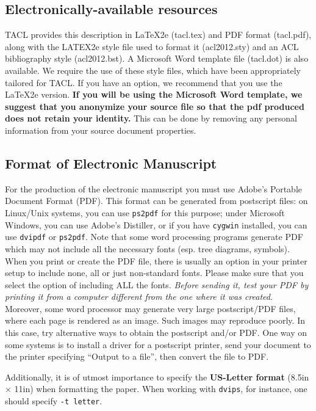 \documentclass[11pt,letterpaper]{article}
\begin{document}
\subsection{Electronically-available resources}

TACL provides this description in \LaTeX2e (tacl.tex) and PDF format (tacl.pdf), along with the LATEX2e style file used to format it (acl2012.sty) and an ACL bibliography style (acl2012.bst).  A Microsoft Word template file (tacl.dot) is also available. We require the use of these style files, which have been appropriately tailored for TACL. If you have an option, we recommend that you use the \LaTeX2e version. \textbf{If you will be using the Microsoft Word template, we suggest that you anonymize your source file so that the pdf produced does not retain your identity.} This can be done by removing any personal information from your source
document properties.


\subsection{Format of Electronic Manuscript}
\label{sect:pdf}

For the production of the electronic manuscript you must use Adobe's
Portable Document Format (PDF). This format can be generated from
postscript files: on Linux/Unix systems, you can use {\tt ps2pdf} for this
purpose; under Microsoft Windows, you can use Adobe's Distiller, or
if you have {\tt cygwin} installed, you can use {\tt dvipdf} or
{\tt ps2pdf}.  Note
that some word processing programs generate PDF which may not include
all the necessary fonts (esp. tree diagrams, symbols). When you print
or create the PDF file, there is usually an option in your printer
setup to include none, all or just non-standard fonts.  Please make
sure that you select the option of including ALL the fonts.  {\em Before sending it, test your PDF by printing it from a computer different from the one where it was created}. Moreover,
some word processor may generate very large postscript/PDF files,
where each page is rendered as an image. Such images may reproduce
poorly.  In this case, try alternative ways to obtain the postscript
and/or PDF.  One way on some systems is to install a driver for a
postscript printer, send your document to the printer specifying
``Output to a file'', then convert the file to PDF.

Additionally, it is of utmost importance to specify the {\bf US-Letter format} (8.5in $\times$ 11in) when formatting the paper. When working with {\tt dvips}, for instance, one should specify {\tt -t letter}.
\end{document}
